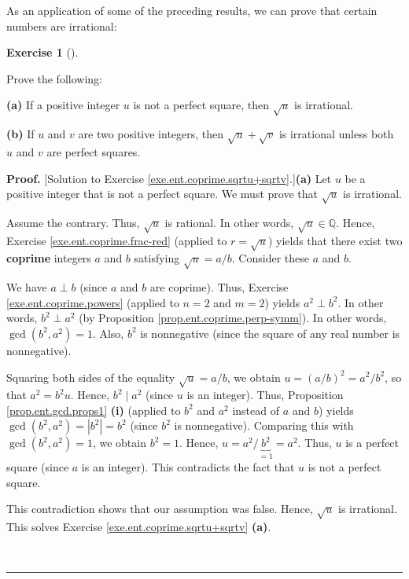 \documentclass[numbers=enddot,12pt,final,onecolumn,notitlepage]{scrartcl}%
\newcounter{exer}
\numberwithin{exer}{subsection}
\theoremstyle{definition}
\newtheorem{exmp}[exer]{Exercise}
\newenvironment{exercise}[1][]
{\begin{exmp}[#1]\begin{leftbar}}
{\end{leftbar}\end{exmp}}
\newenvironment{fineprint}{\begin{small}}{\end{small}}
\newenvironment{proof}[1][Proof]{\noindent\textbf{#1.} }{\ \rule{0.5em}{0.5em}}
\begin{document}
As an application of some of the preceding results, we can prove that certain
numbers are irrational:

\begin{exercise}
\label{exe.ent.coprime.sqrtu+sqrtv}Prove the following:

\textbf{(a)} If a positive integer $u$ is not a perfect square\footnotemark,
then $\sqrt{u}$ is irrational.

\textbf{(b)} If $u$ and $v$ are two positive integers, then $\sqrt{u}+\sqrt
{v}$ is irrational unless both $u$ and $v$ are perfect squares.
\end{exercise}


\begin{fineprint}
\begin{proof}
[Solution to Exercise \ref{exe.ent.coprime.sqrtu+sqrtv}.]\textbf{(a)} Let $u$
be a positive integer that is not a perfect square. We must prove that
$\sqrt{u}$ is irrational.

Assume the contrary. Thus, $\sqrt{u}$ is rational. In other words, $\sqrt
{u}\in\mathbb{Q}$. Hence, Exercise \ref{exe.ent.coprime.frac-red} (applied to
$r=\sqrt{u}$) yields that there exist two \textbf{coprime} integers $a$ and
$b$ satisfying $\sqrt{u}=a/b$. Consider these $a$ and $b$.

We have $a\perp b$ (since $a$ and $b$ are coprime). Thus, Exercise
\ref{exe.ent.coprime.powers} (applied to $n=2$ and $m=2$) yields $a^{2}\perp
b^{2}$. In other words, $b^{2}\perp a^{2}$ (by Proposition
\ref{prop.ent.coprime.perp-symm}). In other words, $\gcd\left(  b^{2}%
,a^{2}\right)  =1$. Also, $b^{2}$ is nonnegative (since the square of any real
number is nonnegative).

Squaring both sides of the equality $\sqrt{u}=a/b$, we obtain $u=\left(
a/b\right)  ^{2}=a^{2}/b^{2}$, so that $a^{2}=b^{2}u$. Hence, $b^{2}\mid
a^{2}$ (since $u$ is an integer). Thus, Proposition \ref{prop.ent.gcd.props1}
\textbf{(i)} (applied to $b^{2}$ and $a^{2}$ instead of $a$ and $b$) yields
$\gcd\left(  b^{2},a^{2}\right)  =\left\vert b^{2}\right\vert =b^{2}$ (since
$b^{2}$ is nonnegative). Comparing this with $\gcd\left(  b^{2},a^{2}\right)
=1$, we obtain $b^{2}=1$. Hence, $u=a^{2}/\underbrace{b^{2}}_{=1}=a^{2}$.
Thus, $u$ is a perfect square (since $a$ is an integer). This contradicts the
fact that $u$ is not a perfect square.

This contradiction shows that our assumption was false. Hence, $\sqrt{u}$ is
irrational. This solves Exercise \ref{exe.ent.coprime.sqrtu+sqrtv}
\textbf{(a)}.


\end{proof}
\end{fineprint}
\end{document}
